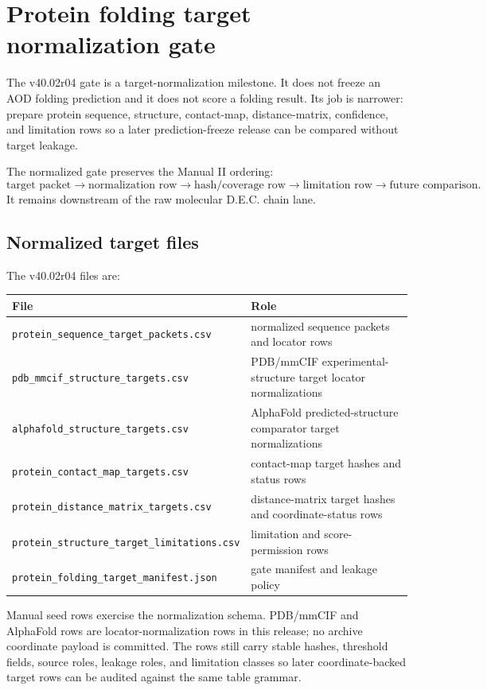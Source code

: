 \section{Protein folding target normalization gate}

The v40.02r04 gate is a target-normalization milestone. It does not freeze an AOD folding prediction and it does not score a folding result. Its job is narrower: prepare protein sequence, structure, contact-map, distance-matrix, confidence, and limitation rows so a later prediction-freeze release can be compared without target leakage.

The normalized gate preserves the Manual II ordering:
\[
\text{target packet}\to\text{normalization row}\to\text{hash/coverage row}\to\text{limitation row}\to\text{future comparison}.
\]
It remains downstream of the raw molecular D.E.C. chain lane.

\subsection{Normalized target files}

The v40.02r04 files are:
\begin{center}
\begin{tabularx}{\linewidth}{@{}lX@{}}
\toprule
File & Role \\
\midrule
\texttt{protein\_sequence\_target\_packets.csv} & normalized sequence packets and locator rows \\
\texttt{pdb\_mmcif\_structure\_targets.csv} & PDB/mmCIF experimental-structure target locator normalizations \\
\texttt{alphafold\_structure\_targets.csv} & AlphaFold predicted-structure comparator target normalizations \\
\texttt{protein\_contact\_map\_targets.csv} & contact-map target hashes and status rows \\
\texttt{protein\_distance\_matrix\_targets.csv} & distance-matrix target hashes and coordinate-status rows \\
\texttt{protein\_structure\_target\_limitations.csv} & limitation and score-permission rows \\
\texttt{protein\_folding\_target\_manifest.json} & gate manifest and leakage policy \\
\bottomrule
\end{tabularx}
\end{center}

Manual seed rows exercise the normalization schema. PDB/mmCIF and AlphaFold rows are locator-normalization rows in this release; no archive coordinate payload is committed. The rows still carry stable hashes, threshold fields, source roles, leakage roles, and limitation classes so later coordinate-backed target rows can be audited against the same table grammar.

